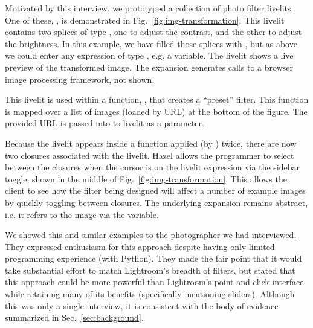 
Motivated by this interview,
we prototyped a collection of photo filter livelits.
One of these, , is demonstrated in Fig.~\ref{fig:img-transformation}. 
This livelit contains two splices of type ,
one to adjust the contrast, and the other to adjust the brightness.
In this example, we have filled those splices with , but
as above we could enter any expression of type , e.g. a variable.
The livelit shows a live preview of the transformed image.
The expansion generates calls to a browser image processing framework, 
not shown.

This livelit is used within a function, , that creates a ``preset'' filter. 
This function is mapped over a list of images (loaded by URL) at the bottom of the figure. 
The provided URL is passed into to livelit as a parameter.

Because the livelit appears inside a function applied (by ) twice, 
there are now two closures associated with the livelit. 
Hazel allows the programmer to select between the closures when 
the cursor is on the livelit expression via the sidebar toggle,
shown in the middle of Fig.~\ref{fig:img-transformation}.
This allows the client to see how the filter being designed will affect a
number of example images by quickly toggling between closures.
The underlying expansion remains abstract, i.e. it refers to the image via the  variable.

We showed this and similar examples to the photographer we had interviewed.
They expressed enthusiasm for this approach despite having only
limited programming experience (with Python). They made the fair point that it
would take substantial effort to match Lightroom's breadth of filters,
but stated that this approach could be more powerful than
Lightroom's point-and-click interface while retaining many of its benefits (specifically
mentioning sliders). Although this was only a single interview,
it is consistent with the body of evidence summarized in Sec.~\ref{sec:background}.


